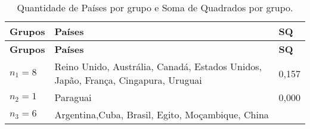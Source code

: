 \documentclass[
  openany]{book}
\begin{document}
\begin{longtable}[]{@{}lll@{}}
\caption{\label{tab:excmeans2} Quantidade de Países por grupo e Soma de Quadrados por grupo.}\tabularnewline
\toprule
\begin{minipage}[b]{0.30\columnwidth}\raggedright
\textbf{Grupos}\strut
\end{minipage} & \begin{minipage}[b]{0.30\columnwidth}\raggedright
\textbf{Países}\strut
\end{minipage} & \begin{minipage}[b]{0.30\columnwidth}\raggedright
\textbf{SQ}\strut
\end{minipage}\tabularnewline
\midrule
\endfirsthead
\toprule
\begin{minipage}[b]{0.30\columnwidth}\raggedright
\textbf{Grupos}\strut
\end{minipage} & \begin{minipage}[b]{0.30\columnwidth}\raggedright
\textbf{Países}\strut
\end{minipage} & \begin{minipage}[b]{0.30\columnwidth}\raggedright
\textbf{SQ}\strut
\end{minipage}\tabularnewline
\midrule
\endhead
\begin{minipage}[t]{0.30\columnwidth}\raggedright
\(n_1=8\)\strut
\end{minipage} & \begin{minipage}[t]{0.30\columnwidth}\raggedright
Reino Unido, Austrália, Canadá, Estados Unidos, Japão, França, Cingapura, Uruguai\strut
\end{minipage} & \begin{minipage}[t]{0.30\columnwidth}\raggedright
0,157\strut
\end{minipage}\tabularnewline
\begin{minipage}[t]{0.30\columnwidth}\raggedright
\(n_2=1\)\strut
\end{minipage} & \begin{minipage}[t]{0.30\columnwidth}\raggedright
Paraguai\strut
\end{minipage} & \begin{minipage}[t]{0.30\columnwidth}\raggedright
0,000\strut
\end{minipage}\tabularnewline
\begin{minipage}[t]{0.30\columnwidth}\raggedright
\(n_3=6\)\strut
\end{minipage} & \begin{minipage}[t]{0.30\columnwidth}\raggedright
Argentina,Cuba, Brasil, Egito, Moçambique, China\strut

\end{minipage}
\end{longtable}
\end{document}
